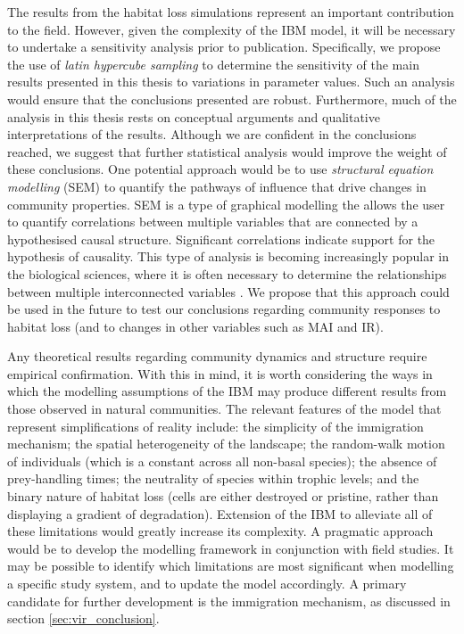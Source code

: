 The results from the habitat loss simulations represent an important contribution to the field. However, given the complexity of the IBM model, it will be necessary to undertake a sensitivity analysis prior to publication. Specifically, we propose the use of \emph{latin hypercube sampling} \cite{helton2003latin} to determine the sensitivity of the main results presented in this thesis to variations in parameter values. Such an analysis would ensure that the conclusions presented are robust. Furthermore, much of the analysis in this thesis rests on conceptual arguments and qualitative interpretations of the results. Although we are confident in the conclusions reached, we suggest that further statistical analysis would improve the weight of these conclusions. One potential approach would be to use \emph{structural equation modelling} (SEM) to quantify the pathways of influence that drive changes in community properties. SEM is a type of graphical modelling the allows the user to quantify correlations between multiple variables that are connected by a hypothesised causal structure. Significant correlations indicate support for the hypothesis of causality. This type of analysis is becoming increasingly popular in the biological sciences, where it is often necessary to determine the relationships between multiple interconnected variables \cite{lefcheck2015piecewisesem,yvon2015five}. We propose that this approach could be used in the future to test our conclusions regarding community responses to habitat loss (and to changes in other variables such as MAI and IR).

Any theoretical results regarding community dynamics and structure require empirical confirmation. With this in mind, it is worth considering the ways in which the modelling assumptions of the IBM may produce different results from those observed in natural communities. The relevant features of the model that represent simplifications of reality include: the simplicity of the immigration mechanism; the spatial heterogeneity of the landscape; the random-walk motion of individuals (which is a constant across all non-basal species); the absence of prey-handling times; the neutrality of species within trophic levels; and the binary nature of habitat loss (cells are either destroyed or pristine, rather than displaying a gradient of degradation). Extension of the IBM to alleviate all of these limitations would greatly increase its complexity. A pragmatic approach would be to develop the modelling framework in conjunction with field studies. It may be possible to identify which limitations are most significant when modelling a specific study system, and to update the model accordingly. A primary candidate for further development is the immigration mechanism, as discussed in section \ref{sec:vir_conclusion}.


